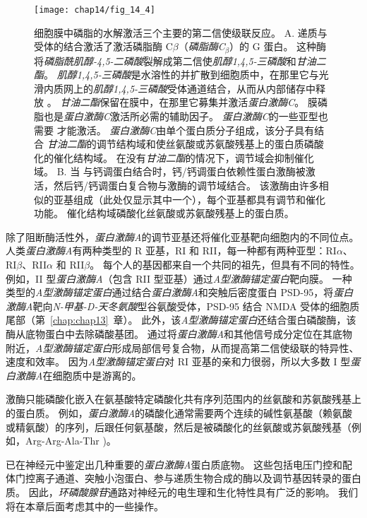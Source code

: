 \begin{figure}[htbp]
	\centering
	\texttt{[image: chap14/fig\_14\_4]}
	\caption{细胞膜中磷脂的水解激活三个主要的第二信使级联反应。
		A. 递质与受体的结合激活了激活磷脂酶 C$\beta$（\textit{磷脂酶C}$_\beta$）的 G 蛋白。
		这种酶将\textit{磷脂酰肌醇-4,5-二磷酸}裂解成第二信使\textit{肌醇1,4,5-三磷酸}和\textit{甘油二酯}。
		\textit{肌醇1,4,5-三磷酸}是水溶性的并扩散到细胞质中，在那里它与光滑内质网上的\textit{肌醇1,4,5-三磷酸}受体通道结合，从而从内部储存中释放 。
		\textit{甘油二酯}保留在膜中，在那里它募集并激活\textit{蛋白激酶C}。
		膜磷脂也是\textit{蛋白激酶C}激活所必需的辅助因子。
		\textit{蛋白激酶C}的一些亚型也需要  才能激活。
		\textit{蛋白激酶C}由单个蛋白质分子组成，该分子具有结合 \textit{甘油二酯}的调节结构域和使丝氨酸或苏氨酸残基上的蛋白质磷酸化的催化结构域。
		在没有\textit{甘油二酯}的情况下，调节域会抑制催化域。
		B. 当  与钙调蛋白结合时，钙/钙调蛋白依赖性蛋白激酶被激活，然后钙/钙调蛋白复合物与激酶的调节域结合。
		该激酶由许多相似的亚基组成（此处仅显示其中一个），每个亚基都具有调节和催化功能。
		催化结构域磷酸化丝氨酸或苏氨酸残基上的蛋白质。}
	\label{fig:14_4}
\end{figure}


除了阻断酶活性外，\textit{蛋白激酶A}的调节亚基还将催化亚基靶向细胞内的不同位点。
人类\textit{蛋白激酶A}有两种类型的 R 亚基，RI 和 RII，每一种都有两种亚型：RI$\alpha$、RI$\beta$、RII$\alpha$ 和 RII$\beta$。
每个人的基因都来自一个共同的祖先，但具有不同的特性。
例如，II 型\textit{蛋白激酶A}（包含 RII 型亚基）通过\textit{A型激酶锚定蛋白}靶向膜。
一种类型的\textit{A型激酶锚定蛋白}通过结合\textit{蛋白激酶A}和突触后密度蛋白 PSD-95，将\textit{蛋白激酶A}靶向\textit{N-甲基-D-天冬氨酸}型谷氨酸受体，PSD-95 结合 NMDA 受体的细胞质尾部（第~\ref{chap:chap13}~章）。
此外，该\textit{A型激酶锚定蛋白}还结合蛋白磷酸酶，该酶从底物蛋白中去除磷酸基团。
通过将\textit{蛋白激酶A}和其他信号成分定位在其底物附近，\textit{A型激酶锚定蛋白}形成局部信号复合物，从而提高第二信使级联的特异性、速度和效率。
因为\textit{A型激酶锚定蛋白}对 RI 亚基的亲和力很弱，所以大多数 I 型\textit{蛋白激酶A}在细胞质中是游离的。


激酶只能磷酸化嵌入在氨基酸特定磷酸化共有序列范围内的丝氨酸和苏氨酸残基上的蛋白质。
例如，\textit{蛋白激酶A}的磷酸化通常需要两个连续的碱性氨基酸（赖氨酸或精氨酸）的序列，后跟任何氨基酸，然后是被磷酸化的丝氨酸或苏氨酸残基（例如，Arg-Arg-Ala-Thr )。


已在神经元中鉴定出几种重要的\textit{蛋白激酶A}蛋白质底物。
这些包括电压门控和配体门控离子通道、突触小泡蛋白、参与递质生物合成的酶以及调节基因转录的蛋白质。
因此，\textit{环磷酸腺苷}通路对神经元的电生理和生化特性具有广泛的影响。
我们将在本章后面考虑其中的一些操作。



